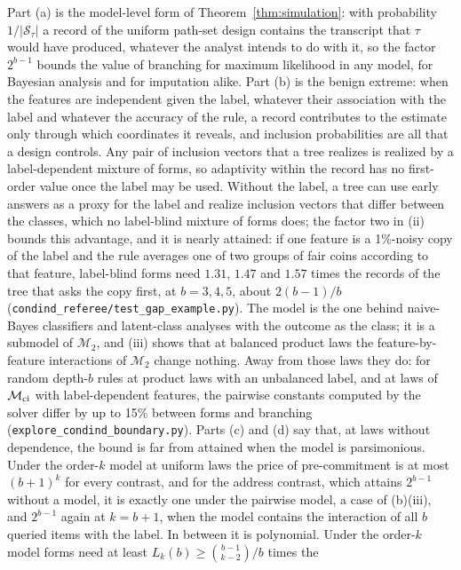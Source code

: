 Part (a) is the model-level form of Theorem~\ref{thm:simulation}: with
probability $1/|\mathcal S_\tau|$ a record of the uniform path-set design
contains the transcript that $\tau$ would have produced, whatever the analyst
intends to do with it, so the factor $2^{b-1}$ bounds the value of branching
for maximum likelihood in any model, for Bayesian analysis and for
imputation alike. Part (b) is the benign extreme: when the features are independent given the label, whatever their association with the label and whatever the accuracy of the rule, a record contributes to the estimate only through which coordinates it reveals, and inclusion probabilities are all that a design controls. Any pair of inclusion vectors that a tree realizes is realized by a label-dependent mixture of forms, so adaptivity within the record has no first-order value once the label may be used. Without the label, a tree can use early answers as a proxy for the label and realize inclusion vectors that differ between the classes, which no label-blind mixture of forms does; the factor two in (ii) bounds this advantage, and it is nearly attained: if one feature is a 1\%-noisy copy of the label and the rule averages one of two groups of fair coins according to that feature, label-blind forms need $1.31$, $1.47$ and $1.57$ times the records of the tree that asks the copy first, at $b=3,4,5$, about $2(b-1)/b$ (\texttt{condind\_referee/test\_gap\_example.py}). The model is the one behind naive-Bayes classifiers and latent-class analyses with the outcome as the class; it is a submodel of $\mathcal M_2$, and (iii) shows that at balanced product laws the feature-by-feature interactions of $\mathcal M_2$ change nothing. Away from those laws they do: for random depth-$b$ rules at product laws with an unbalanced label, and at laws of $\mathcal M_{\rm ci}$ with label-dependent features, the pairwise constants computed by the solver differ by up to 15\% between forms and branching (\texttt{explore\_condind\_boundary.py}). Parts (c) and (d) say that, at laws without dependence,
the bound is far from attained when the model is parsimonious. Under the
order-$k$ model at uniform laws the price of pre-commitment is at most
$(b+1)^k$ for every contrast, and for the address contrast, which attains
$2^{b-1}$ without a model, it is exactly one under the pairwise model, a case of (b)(iii), and
$2^{b-1}$ again at $k=b+1$, when the model contains the interaction of all
$b$ queried items with the label. In between it is polynomial. Under the
order-$k$ model forms need at least $L_k(b)\ge\binom{b-1}{k-2}/b$ times the
